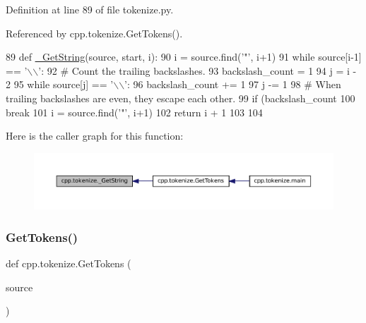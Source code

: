Definition at line 89 of file tokenize.\+py.



Referenced by cpp.\+tokenize.\+Get\+Tokens().


\begin{DoxyCode}
89 \textcolor{keyword}{def }\hyperlink{namespacecpp_1_1tokenize_a3c6a8b154110b4b6a0385ccc3469db77}{\_GetString}(source, start, i):
90     i = source.find(\textcolor{stringliteral}{'"'}, i+1)
91     \textcolor{keywordflow}{while} source[i-1] == \textcolor{stringliteral}{'\(\backslash\)\(\backslash\)'}:
92         \textcolor{comment}{# Count the trailing backslashes.}
93         backslash\_count = 1
94         j = i - 2
95         \textcolor{keywordflow}{while} source[j] == \textcolor{stringliteral}{'\(\backslash\)\(\backslash\)'}:
96             backslash\_count += 1
97             j -= 1
98         \textcolor{comment}{# When trailing backslashes are even, they escape each other.}
99         \textcolor{keywordflow}{if} (backslash\_count %
100             \textcolor{keywordflow}{break}
101         i = source.find(\textcolor{stringliteral}{'"'}, i+1)
102     \textcolor{keywordflow}{return} i + 1
103 
104 
\end{DoxyCode}
Here is the caller graph for this function\+:
\nopagebreak
\begin{figure}[H]
\begin{center}
\leavevmode
\includegraphics[width=350pt]{namespacecpp_1_1tokenize_a3c6a8b154110b4b6a0385ccc3469db77_icgraph}
\end{center}
\end{figure}
\mbox{\label{namespacecpp_1_1tokenize_ab78959b4d0a9c3bade98904a23129afc}} 
\subsubsection{\texorpdfstring{Get\+Tokens()}{GetTokens()}}
{\footnotesize\ttfamily def cpp.\+tokenize.\+Get\+Tokens (\begin{DoxyParamCaption}\item[{}]{source }\end{DoxyParamCaption})}

